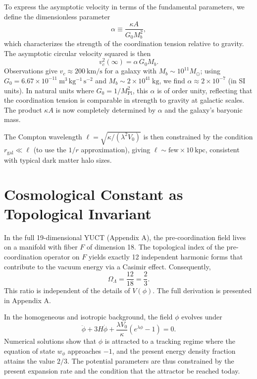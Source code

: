 \documentclass[12pt,a4paper]{article}
\begin{document}
	To express the asymptotic velocity in terms of the fundamental parameters, we define the dimensionless parameter
	\begin{equation}
		\alpha \equiv \frac{\kappa A}{G_0 M_b^2},
		\label{eq:alpha}
	\end{equation}
	which characterizes the strength of the coordination tension relative to gravity. The asymptotic circular velocity squared is then
	\begin{equation}
		v_c^2(\infty) = \alpha\, G_0 M_b.
		\label{eq:vc-squared}
	\end{equation}
	Observations give \(v_c \approx 200\ \mathrm{km/s}\) for a galaxy with \(M_b \sim 10^{11}M_\odot\); using \(G_0 = 6.67\times 10^{-11}\ \mathrm{m^3\,kg^{-1}\,s^{-2}}\) and \(M_b \sim 2\times 10^{41}\ \mathrm{kg}\), we find \(\alpha \approx 2 \times 10^{-7}\) (in SI units). In natural units where \(G_0 = 1/M_{\mathrm{Pl}}^2\), this \(\alpha\) is of order unity, reflecting that the coordination tension is comparable in strength to gravity at galactic scales. The product \(\kappa A\) is now completely determined by \(\alpha\) and the galaxy's baryonic mass.
	
	The Compton wavelength \(\ell = \sqrt{\kappa/(\lambda^2 V_0)}\) is then constrained by the condition \(r_{\mathrm{gal}} \ll \ell\) (to use the \(1/r\) approximation), giving \(\ell \sim \text{few}\times 10\ \mathrm{kpc}\), consistent with typical dark matter halo sizes.
	
	\section{Cosmological Constant as Topological Invariant}
	
	In the full 19-dimensional YUCT (Appendix A), the pre-coordination field lives on a manifold with fiber \(F\) of dimension 18. The topological index of the pre-coordination operator on \(F\) yields exactly 12 independent harmonic forms that contribute to the vacuum energy via a Casimir effect. Consequently,
	\begin{equation}
		\Omega_\Lambda = \frac{12}{18} = \frac{2}{3}.
		\label{eq:OmegaLambda}
	\end{equation}
	This ratio is independent of the details of \(V(\phi)\). The full derivation is presented in Appendix A.
	
	In the homogeneous and isotropic background, the field \(\phi\) evolves under
	\[
	\ddot\phi + 3H \dot\phi + \frac{\lambda V_0}{\kappa}(e^{\lambda\phi}-1) = 0.
	\]
	Numerical solutions show that \(\phi\) is attracted to a tracking regime where the equation of state \(w_\phi\) approaches \(-1\), and the present energy density fraction attains the value \(2/3\). The potential parameters are thus constrained by the present expansion rate and the condition that the attractor be reached today.
	
\end{document}
